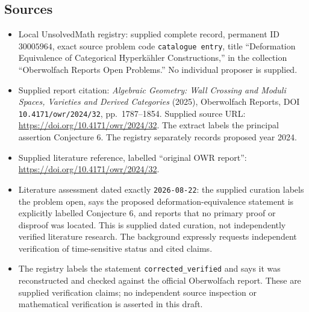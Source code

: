 \documentclass[11pt]{article}
\begin{document}
\subsection{Sources}
\begin{itemize}
\item Local UnsolvedMath registry: supplied complete record, permanent ID \(30005964\), exact source problem code \texttt{catalogue entry}, title ``Deformation Equivalence of Categorical Hyperk\"ahler Constructions,'' in the collection ``Oberwolfach Reports Open Problems.'' No individual proposer is supplied.
\item Supplied report citation: \emph{Algebraic Geometry: Wall Crossing and Moduli Spaces, Varieties and Derived Categories} (2025), Oberwolfach Reports, DOI \texttt{10.4171/owr/2024/32}, pp.\ 1787--1854. Supplied source URL: \url{https://doi.org/10.4171/owr/2024/32}. The extract labels the principal assertion Conjecture 6. The registry separately records proposed year 2024.
\item Supplied literature reference, labelled ``original OWR report'': \url{https://doi.org/10.4171/owr/2024/32}.
\item Literature assessment dated exactly \texttt{2026-08-22}: the supplied curation labels the problem open, says the proposed deformation-equivalence statement is explicitly labelled Conjecture 6, and reports that no primary proof or disproof was located. This is supplied dated curation, not independently verified literature research. The background expressly requests independent verification of time-sensitive status and cited claims.
\item The registry labels the statement \texttt{corrected\_verified} and says it was reconstructed and checked against the official Oberwolfach report. These are supplied verification claims; no independent source inspection or mathematical verification is asserted in this draft.
\end{itemize}
\end{document}
